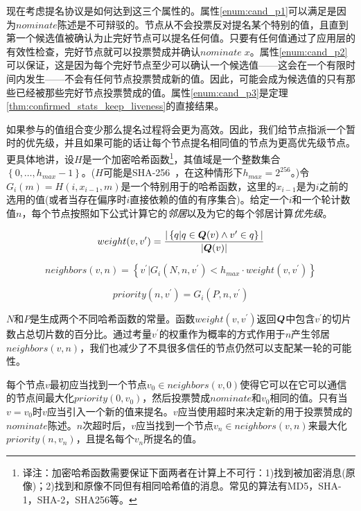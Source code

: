 现在考虑提名协议是如何达到这三个属性的。属性\ref{enum:cand_p1}可以满足是因为$nominate$陈述是不可辩驳的。节点从不会投票反对提名某个特别的值，且直到第一个候选值被确认为止完好节点可以提名任何值。只要有任何值通过了应用层的有效性检查，完好节点就可以投票赞成并确认$nominate\;x$。属性\ref{enum:cand_p2}可以保证，这是因为每个完好节点至少可以确认一个候选值——这会在一个有限时间内发生——不会有任何节点投票赞成新的值。因此，可能会成为候选值的只有那些已经被那些完好节点投票赞成的值。属性\ref{enum:cand_p3}是定理\ref{thm:confirmed_stats_keep_liveness}的直接结果。

如果参与的值组合变少那么提名过程将会更为高效。因此，我们给节点指派一个暂时的优先级，并且如果可能的话让每个节点提名相同值的节点为更高优先级节点。更具体地讲，设$H$是一个加密哈希函数{\footnote{译注：加密哈希函数需要保证下面两者在计算上不可行：1)找到被加密消息(原像)；2)找到和原像不同但有相同哈希值的消息。常见的算法有MD5，SHA-1，SHA-2，SHA256等。}}，其值域是一个整数集合$\left\{0,\dots,h_{max}-1\right\}$。($H$可能是SHA-256~，在这种情形下$h_{max}=2^{256}$。)令$G_i(m)=H(i, x_{i-1},m)$是一个特别用于{\slot}的哈希函数，这里的$x_{i-1}$是为$i$之前的{\slot}选用的值(或者当{\slot}存在偏序时{\slot}$i$直接依赖的值的有序集合)。给定一个{\slot}$i$和一个轮计数值$n$，每个节点按照如下公式计算它的\textit{邻居}以及为它的每个邻居计算\textit{优先级}。

\begin{equation*}
	weight(v,v^{\prime}) = \frac{|\left\{q|q\in{\bm Q}(v)\wedge v^{\prime}\in q\right\}|}{|{\bm Q}(v)|}
\end{equation*}

\begin{equation*}
	neighbors(v,n) = \left\{v^{\prime}|G_i(N,n,v^{\prime})<h_{max}\cdot weight(v,v^{\prime})\right\}
\end{equation*}

\begin{equation*}
	priority(n,v^{\prime}) = G_i(P,n,v^{\prime})
\end{equation*}

$N$和$P$是生成两个不同哈希函数的常量。函数$weight(v,v^{\prime})$返回${\bm Q}$中包含$v^{\prime}$的切片数占总切片数的百分比。通过考量$v^{\prime}$的权重作为概率的方式作用于$n$产生邻居$neighbors(v,n)$，我们也减少了不具很多信任的节点仍然可以支配某一轮的可能性。

每个节点$v$最初应当找到一个节点$v_0\in neighbors(v,0)$使得它可以在它可以通信的节点间最大化$priority(0,v_0)$，然后投票赞成$nominate$和$v_0$相同的值。只有当$v=v_0$时$v$应当引入一个新的值来提名。$v$应当使用超时来决定新的用于投票赞成的$nominate$陈述。$n$次超时后，$v$应当找到一个节点$v_n\in neighbors(v,n)$来最大化$priority(n,v_n)$，且提名每个$v_n$所提名的值。

